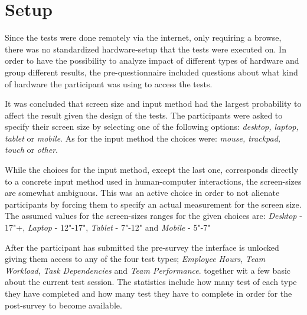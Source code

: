 \documentclass[nofilelist,dvipsnames]{cslthse-msc}
\begin{document}
%
%
%
%
%
%
%

    \section{Setup}

      Since the tests were done remotely via the internet, only requiring a
      browse, there was no standardized hardware-setup that the tests were
      executed on. In order to have the possibility to analyze impact of
      different types of hardware and group different results, the
      pre-questionnaire included questions about what kind of hardware the
      participant was using to access the tests.

      It was concluded that screen size and input method had the largest
      probability to affect the result given the design of the tests.
      The participants were asked to specify their screen size by selecting one
      of the following options: \textit{desktop, laptop, tablet} or
      \textit{mobile}. As for the input method the choices were:
      \textit{mouse, trackpad, touch} or \textit{other}.

      While the choices for the input method, except the last one, corresponds
      directly to a concrete input method used in human-computer interactions,
      the screen-sizes are somewhat ambiguous. This was an active choice in
      order to not alienate participants by forcing them to specify an actual
      measurement for the screen size.
      The assumed values for the screen-sizes ranges for the given choices are:
      \textit{Desktop} - 17"+,
      \textit{Laptop} -  12"-17",
      \textit{Tablet} - 7"-12" and
      \textit{Mobile} - 5"-7"

      After the participant has submitted the pre-survey the interface is
      unlocked giving them access to any of the four test types;
      \textit{Employee Hours},
      \textit{Team Workload},
      \textit{Task Dependencies} and
      \textit{Team Performance}.
      together wit a few basic about the current test session. The statistics
      include how many test of each type they have completed and how many test
      they have to complete in order for the post-survey to become available.
\end{document}
